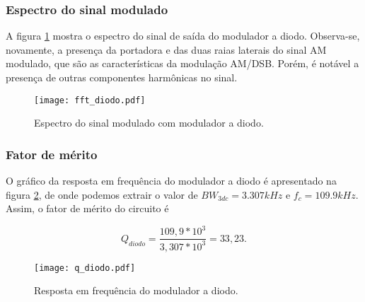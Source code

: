 \subsubsection{Espectro do sinal modulado}
A figura \ref{f_fft_diodo} mostra o espectro do sinal de saída do modulador a diodo. Observa-se, novamente, a presença da portadora e das duas raias laterais do sinal AM modulado, que são as características da modulação AM/DSB. Porém, é notável a presença de outras componentes harmônicas no sinal.

\begin{figure}[H]
    \centering
    \caption{Espectro do sinal modulado com modulador a diodo.}
    \texttt{[image: fft\_diodo.pdf]}
    \label{f_fft_diodo}
\end{figure}

\subsubsection{Fator de mérito}
O gráfico da resposta em frequência do modulador a diodo é apresentado na figura \ref{f_q_diodo}, de onde podemos extrair o valor de $BW_{3dc} = 3.307 kHz$ e $f_c = 109.9 kHz$. Assim, o fator de mérito do circuito é

\[
Q_{diodo} = \frac{109,9*10^3}{3,307*10^3} = 33,23. 
\]


\begin{figure}[H]
    \centering
    \caption{Resposta em frequência do modulador a diodo.}
    \texttt{[image: q\_diodo.pdf]}
    \label{f_q_diodo}
\end{figure}


